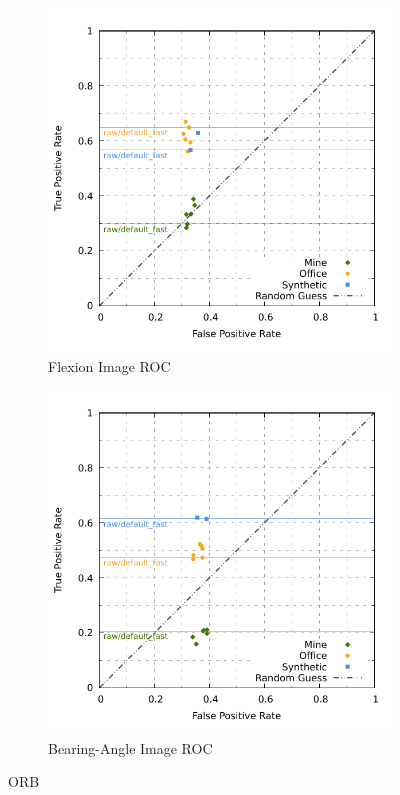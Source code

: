\begin{figure}[H]
\begin{subfigure}[t]{0.45\linewidth}
    \includegraphics[width=\linewidth]{chapter06/results/ORB/flexion/roc.pdf}%
    \caption{Flexion Image ROC}
\end{subfigure}\quad
\begin{subfigure}[t]{0.45\linewidth}
    \includegraphics[width=\linewidth]{chapter06/results/ORB/bearing/roc.pdf}
    \caption{Bearing-Angle Image ROC}
\end{subfigure}
    \caption{ORB}
\end{figure}

